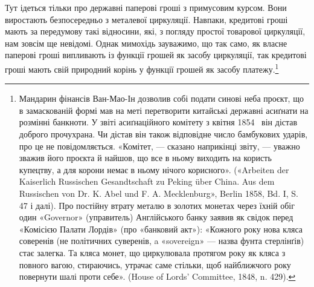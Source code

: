 Тут ідеться тільки про державні паперові гроші з примусовим
курсом. Вони виростають безпосередньо з металевої циркуляції.
Навпаки, кредитові гроші мають за передумову такі відносини,
які, з погляду простої товарової циркуляції, нам зовсім ще невідомі.
Однак мимохідь зауважимо, що так само, як власне паперові
гроші випливають із функції грошей як засобу циркуляції,
так кредитові гроші мають свій природний корінь у функції
грошей як засобу платежу.\footnote{
Мандарин фінансів Ван-Мао-Ін дозволив собі подати синові
неба проєкт, що в замаскованій формі мав на меті перетворити китайські
державні асиґнати на розмінні банкноти. У звіті асиґнаційного комітету
з квітня 1854~ він дістав доброго прочухрана. Чи дістав він також відповідне
число бамбукових ударів, про це не повідомляється. «Комітет, —
сказано наприкінці звіту, — уважно зважив його проєкта й найшов, що
все в ньому виходить на користь купецтву, а для корони немає в ньому
нічого корисного». («Arbeiten der Kaiserlich Russischen Gesandtschaft zu
Peking über China. Aus dem Russischen von Dr. K. Abel und F. A. Mecklenburg»,
Berlin 1858, Bd. I, S. 47 і далі). Про постійну втрату металю в
золотих монетах через їхній обіг один «Governor» (управитель) Англійського
банку заявив як свідок перед «Комісією Палати Лордів» (про
«банковий акт»): «Кожного року нова кляса соверенів (не політичних
суверенів, a «sovereign» — назва фунта стерлінґів) стає залегка. Та кляса
монет, що циркулювала протягом року як кляса з повного вагою, стираючись,
утрачає саме стільки, щоб найближчого року повернути шалі
проти себе». (House of Lords’ Committee, 1848, n. 429).
}

